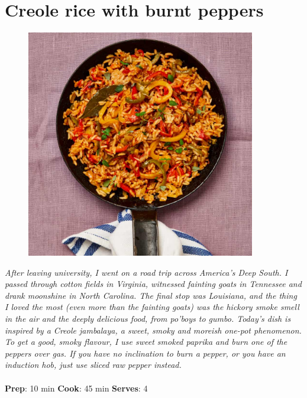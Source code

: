 \documentclass{book}
\begin{document}
\section{Creole rice with burnt peppers}
\begin{figure}
\centering\includegraphics[width=10cm,height=10cm,keepaspectratio]{Recipe_Pictures/Creole_rice_with_burnt_peppers.png}
\end{figure}
\emph{After leaving university, I went on a road trip across America’s Deep South. I passed through cotton fields in Virginia, witnessed fainting goats in Tennessee and drank moonshine in North Carolina. The final stop was Louisiana, and the thing I loved the most (even more than the fainting goats) was the hickory smoke smell in the air and the deeply delicious food, from po’boys to gumbo. Today’s dish is inspired by a Creole jambalaya, a sweet, smoky and moreish one-pot phenomenon.\\ 
To get a good, smoky flavour, I use sweet smoked paprika and burn one of the peppers over gas. If you have no inclination to burn a pepper, or you have an induction hob, just use sliced raw pepper instead.}\\\\ 
\textbf{Prep}: 10 min
\textbf{Cook}: 45 min
\textbf{Serves}: 4
\end{document}
